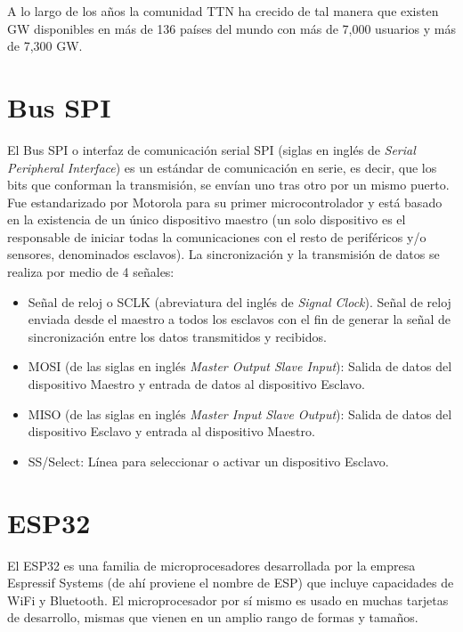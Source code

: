 A lo largo de los años la comunidad TTN ha crecido de tal manera que existen GW disponibles en más de 136 países del mundo con más de 7,000 usuarios y más de 7,300 GW.

\section{Bus SPI}

El Bus SPI o interfaz de comunicación serial SPI (siglas en inglés de \textit{Serial Peripheral Interface}) es un estándar de comunicación en serie, es decir, que los bits que conforman la transmisión, se envían uno tras otro por un mismo puerto. Fue estandarizado por Motorola para su primer microcontrolador y está basado en la existencia de un único dispositivo maestro (un solo dispositivo es el responsable de iniciar todas la comunicaciones con el resto de periféricos y/o sensores, denominados esclavos). La sincronización y la transmisión de datos se realiza por medio de 4 señales:

\begin{itemize}
    \item Señal de reloj o SCLK (abreviatura del inglés de \textit{Signal Clock}). Señal de reloj enviada desde el maestro a todos los esclavos con el fin de generar la señal de sincronización entre los datos transmitidos y recibidos. 
    \item MOSI (de las siglas en inglés \textit{Master Output Slave Input}): Salida de datos del dispositivo Maestro y entrada de datos al dispositivo Esclavo.
    \item MISO (de las siglas en inglés \textit{Master Input Slave Output}): Salida de datos del dispositivo Esclavo y entrada al dispositivo Maestro.
    \item SS/Select: Línea para seleccionar o activar un dispositivo Esclavo.
\end{itemize}


\section{ESP32}

El ESP32 es una familia de microprocesadores desarrollada por la empresa Espressif Systems (de ahí proviene el nombre de ESP) que incluye capacidades de WiFi y Bluetooth. El microprocesador por sí mismo es usado en muchas tarjetas de desarrollo, mismas que vienen en un amplio rango de formas y tamaños. 

\vspace{0.5cm}

